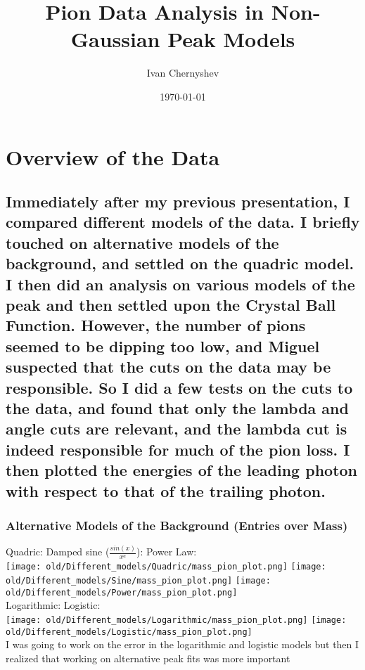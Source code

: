 \documentclass{beamer}
\title{Pion Data Analysis in Non-Gaussian Peak Models}
\author{Ivan Chernyshev}
\date{\today}
\begin{document}
\frame{\titlepage}

\section[Outline]{}
\frame{\tableofcontents}

\section{Overview of the Data}
\subsection{Immediately after my previous presentation, I compared different models of the data. I briefly touched on alternative models of the background, and settled on the quadric model. I then did an analysis on various models of the peak and then settled upon the Crystal Ball Function. However, the number of pions seemed to be dipping too low, and Miguel suspected that the cuts on the data may be responsible. So I did a few tests on the cuts to the data, and found that only the lambda and angle cuts are relevant, and the lambda cut is indeed responsible for much of the pion loss. I then plotted the energies of the leading photon with respect to that of the trailing photon.
}
\frame
{
  \frametitle{Alternative Models of the Background (Entries over Mass)}
Quadric: 
\noindent\hspace{2.5 cm}Damped sine ($\frac{sin(x)}{x^a}$):
\noindent\hspace{1.0 cm}Power Law:\\
\texttt{[image: old/Different\_models/Quadric/mass\_pion\_plot.png]}
\texttt{[image: old/Different\_models/Sine/mass\_pion\_plot.png]}
\texttt{[image: old/Different\_models/Power/mass\_pion\_plot.png]}\\
Logarithmic:  
\noindent\hspace{1.5 cm}Logistic:\\
\texttt{[image: old/Different\_models/Logarithmic/mass\_pion\_plot.png]}
\texttt{[image: old/Different\_models/Logistic/mass\_pion\_plot.png]}\\
I was going to work on the error in the logarithmic and logistic models but then I realized that working on alternative peak fits was more important
}
\frame
\end{document}
